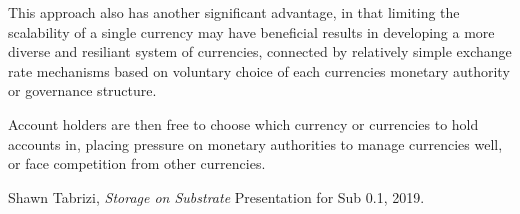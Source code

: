 \documentclass[a4paper]{book}
\begin{document}
This approach also has another significant advantage, in that limiting the scalability of a single
currency may have beneficial results in developing a more diverse and resiliant system of
currencies, connected by relatively simple exchange rate mechanisms based on voluntary choice of
each currencies monetary authority or governance structure.

Account holders are then free to choose which currency or currencies to hold accounts in, placing
pressure on monetary authorities to manage currencies well, or face competition from other
currencies.

\begin{thebibliography}{9}

    Shawn Tabrizi,
    \emph{Storage on Substrate}
    Presentation for Sub 0.1,
    2019.

\end{thebibliography}
\end{document}
